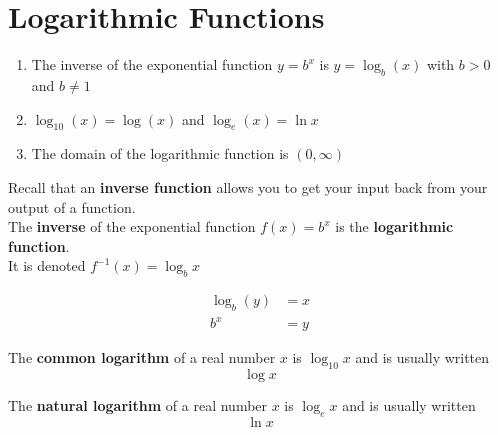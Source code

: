 \documentclass{article}
\begin{document}
\section*{Logarithmic Functions}

\begin{tcolorbox}[colframe=orange!70!white, coltitle=black, title=\textbf{Summary}]
\begin{enumerate}
    \item The inverse of the exponential function $y = b^x$ is $y = \log_b(x)$ with $b > 0$ and $b \neq 1$
    \item $\log_{10}(x) = \log (x)$ and $\log_e (x) = \ln x$
    \item The domain of the logarithmic function is $(0, \infty)$
\end{enumerate}
\end{tcolorbox}

\vfill

Recall that an {\color{violet}\textbf{inverse function}} allows you to get your input back from your output of a function. \\[0.5in]

The \textbf{inverse} of the exponential function $f(x) = b^x$  is the {\color{blue}\textbf{logarithmic function}}. \newline\\ 

It is denoted $f^{-1}(x) = \log_b x$

\begin{align*}
    \log_b(y) &= x \\[24pt]
    b^x &= y
\end{align*}

\vfill

\begin{tcolorbox}[colframe=green!60!black, title=\textbf{Common Logarithm}]
The \textbf{common logarithm} of a real number $x$ is $\log_{10}x$ and is usually written \[\log x\]
\end{tcolorbox}

\vfill

\begin{tcolorbox}[colframe=green!60!black, title=\textbf{Natural Logarithm}]
The \textbf{natural logarithm} of a real number $x$ is $\log_e x$ and is usually written \[\ln x\]
\end{tcolorbox}

\vfill

\newpage
\end{document}
